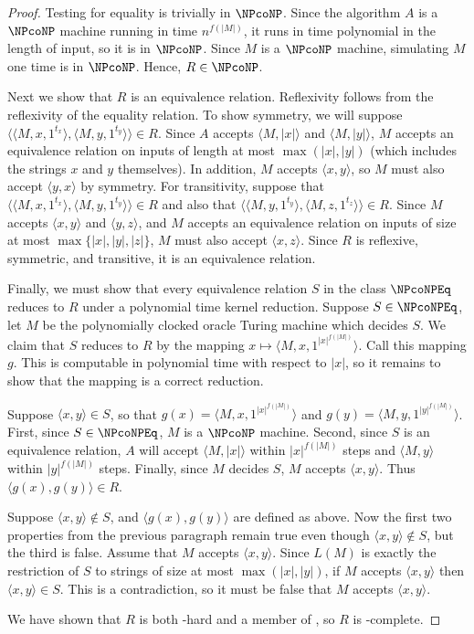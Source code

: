 \documentclass[draft]{article}
\theoremstyle{definition} \newtheorem{openproblem}[openproblem]{Open problem}
\theoremstyle{definition} \newtheorem{definition}[definition]{Definition}
\theoremstyle{remark} \newtheorem{remark}[remark]{Remark}
\newcommand{\pair}[2]{\langle#1,#2\rangle} %
\newcommand{\triple}[3]{\langle#1,#2,#3\rangle} %
\begin{document}
\begin{proof}
  Testing for equality is trivially in $\NPcoNP$.
  Since the algorithm $A$ is a $\NPcoNP$ machine running in time $n^{f(|M|)}$, it runs in time polynomial in the length of input, so it is in $\NPcoNP$.
  Since $M$ is a $\NPcoNP$ machine, simulating $M$ one time is in $\NPcoNP$.
  Hence, $R\in\NPcoNP$.

  Next we show that $R$ is an equivalence relation.
  Reflexivity follows from the reflexivity of the equality relation.
  To show symmetry, we will suppose $\pair{\triple{M}{x}{1^{t_x}}}{\triple{M}{y}{1^{t_y}}}\in R$.
  Since $A$ accepts $\pair{M}{|x|}$ and $\pair{M}{|y|}$, $M$ accepts an equivalence relation on inputs of length at most $\max(|x|, |y|)$ (which includes the strings $x$ and $y$ themselves).
  In addition, $M$ accepts $\pair{x}{y}$, so $M$ must also accept $\pair{y}{x}$ by symmetry.
  For transitivity, suppose that $\pair{\triple{M}{x}{1^{t_x}}}{\triple{M}{y}{1^{t_y}}}\in R$ and also that $\pair{\triple{M}{y}{1^{t_y}}}{\triple{M}{z}{1^{t_z}}}\in R$.
  Since $M$ accepts $\pair{x}{y}$ and $\pair{y}{z}$, and $M$ accepts an equivalence relation on inputs of size at most $\max\{|x|, |y|, |z|\}$, $M$ must also accept $\pair{x}{z}$.
  Since $R$ is reflexive, symmetric, and transitive, it is an equivalence relation.

  Finally, we must show that every equivalence relation $S$ in the class $\NPcoNPEq$ reduces to $R$ under a polynomial time kernel reduction.
  Suppose $S\in\NPcoNPEq$, let $M$ be the polynomially clocked oracle Turing machine which decides $S$.
  We claim that $S$ reduces to $R$ by the mapping $x\mapsto \triple{M}{x}{1^{|x|^{f(|M|)}}}$.
  Call this mapping $g$.
  This is computable in polynomial time with respect to $|x|$, so it remains to show that the mapping is a correct reduction.

  Suppose $\pair{x}{y}\in S$, so that $g(x) = \triple{M}{x}{1^{|x|^{f(|M|)}}}$ and $g(y) = \triple{M}{y}{1^{|y|^{f(|M|)}}}$.
  First, since $S\in\NPcoNPEq$, $M$ is a $\NPcoNP$ machine.
  Second, since $S$ is an equivalence relation, $A$ will accept $\pair{M}{|x|}$ within $|x|^{f(|M|)}$ steps and $\pair{M}{y}$ within $|y|^{f(|M|)}$ steps.
  Finally, since $M$ decides $S$, $M$ accepts $\pair{x}{y}$.
  Thus $\pair{g(x)}{g(y)}\in R$.

  Suppose $\pair{x}{y}\notin S$, and $\pair{g(x)}{g(y)}$ are defined as above.
  Now the first two properties from the previous paragraph remain true even though $\pair{x}{y}\notin S$, but the third is false.
  Assume that $M$ accepts $\pair{x}{y}$.
  Since $L(M)$ is exactly the restriction of $S$ to strings of size at most $\max(|x|, |y|)$, if $M$ accepts $\pair{x}{y}$ then $\pair{x}{y}\in S$.
  This is a contradiction, so it must be false that $M$ accepts $\pair{x}{y}$.

  We have shown that $R$ is both \NPcoNPEq-hard and a member of \NPcoNPEq, so $R$ is \NPcoNPEq-complete.
\end{proof}
\end{document}
